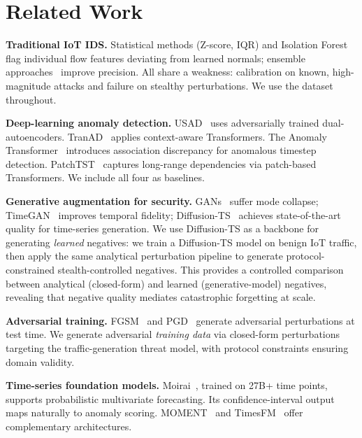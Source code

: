 \section{Related Work}
\label{sec:related}

\textbf{Traditional IoT IDS.}
Statistical methods (Z-score, IQR) and Isolation
Forest~\cite{liu2012isolation} flag individual flow features deviating
from learned normals; ensemble approaches~\cite{garcia2014empirical}
improve precision.  All share a weakness: calibration on known,
high-magnitude attacks and failure on stealthy perturbations.
We use the \dataset{} dataset~\cite{neto2023ciciot} throughout.

\textbf{Deep-learning anomaly detection.}
USAD~\cite{audibert2020usad} uses adversarially trained dual-autoencoders.
TranAD~\cite{tuli2022tranad} applies context-aware Transformers.
The Anomaly Transformer~\cite{xu2022anomaly} introduces association
discrepancy for anomalous timestep detection.
PatchTST~\cite{nie2023patchtst} captures long-range dependencies via
patch-based Transformers.
We include all four as baselines.

\textbf{Generative augmentation for security.}
GANs~\cite{lin2018idsgan} suffer mode collapse; TimeGAN~\cite{yoon2019timegan}
improves temporal fidelity; Diffusion-TS~\cite{zhang2024diffusionts}
achieves state-of-the-art quality for time-series generation.
We use Diffusion-TS as a backbone for generating \emph{learned}
negatives: we train a Diffusion-TS model on benign IoT traffic, then
apply the same analytical perturbation pipeline to generate
protocol-constrained stealth-controlled negatives.
This provides a controlled comparison between analytical (closed-form)
and learned (generative-model) negatives, revealing that negative
quality mediates catastrophic forgetting at scale.

\textbf{Adversarial training.}
FGSM~\cite{goodfellow2015adversarial} and PGD~\cite{madry2018pgd} generate
adversarial perturbations at test time.  We generate adversarial
\emph{training data} via closed-form perturbations targeting the
traffic-generation threat model, with protocol constraints ensuring
domain validity.

\textbf{Time-series foundation models.}
Moirai~\cite{woo2024moirai}, trained on 27B+ time points, supports
probabilistic multivariate forecasting.
Its confidence-interval output maps naturally to anomaly scoring.
MOMENT~\cite{goswami2024moment} and TimesFM~\cite{das2024timeseries}
offer complementary architectures.

